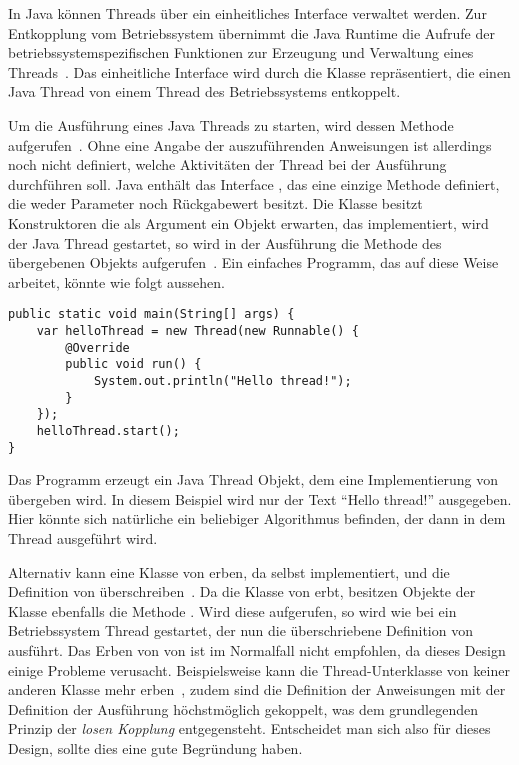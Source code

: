 In Java können Threads über ein einheitliches Interface verwaltet werden. Zur Entkopplung vom Betriebssystem übernimmt die Java Runtime die Aufrufe der betriebssystemspezifischen Funktionen zur Erzeugung und Verwaltung eines Threads~\cite[S.~3]{Friesen2015}. Das einheitliche Interface wird durch die Klasse  repräsentiert, die einen Java Thread von einem Thread des  Betriebssystems entkoppelt. 

Um die Ausführung eines Java Threads zu starten, wird dessen Methode  aufgerufen~\cite[S.~8]{Friesen2015}. Ohne eine Angabe der auszuführenden Anweisungen ist allerdings noch nicht definiert, welche Aktivitäten der Thread bei der Ausführung durchführen soll. Java enthält das Interface , das eine einzige Methode  definiert, die weder Parameter noch Rückgabewert besitzt. Die Klasse  besitzt Konstruktoren die als Argument ein Objekt erwarten, das  implementiert, wird der Java Thread gestartet, so wird in der Ausführung die  Methode des übergebenen Objekts aufgerufen~\cite[S.~3]{Friesen2015}. Ein einfaches Programm, das auf diese Weise arbeitet, könnte wie folgt aussehen.
\begin{lstlisting}
public static void main(String[] args) {
	var helloThread = new Thread(new Runnable() {
		@Override
		public void run() {
			System.out.println("Hello thread!");
		}
	});
	helloThread.start();
}
\end{lstlisting}
Das Programm erzeugt ein Java Thread Objekt, dem eine Implementierung von  übergeben wird. In diesem Beispiel wird nur der Text \enquote{Hello thread!} ausgegeben. Hier könnte sich natürliche ein beliebiger Algorithmus befinden, der dann in dem Thread ausgeführt wird.

Alternativ kann eine Klasse von  erben, da  selbst  implementiert, und die Definition von  überschreiben~\cite[S.~335]{Rauber2006}. Da die Klasse von  erbt, besitzen Objekte der Klasse ebenfalls die Methode . Wird diese aufgerufen, so wird wie bei  ein Betriebssystem Thread gestartet, der nun die überschriebene Definition von  ausführt. Das Erben von von  ist im Normalfall nicht empfohlen, da dieses Design einige Probleme verusacht. Beispielsweise kann die Thread-Unterklasse von keiner anderen Klasse mehr erben~\cite[S.~335]{Rauber2006}, zudem sind die Definition der Anweisungen mit der Definition der Ausführung höchstmöglich gekoppelt, was dem grundlegenden Prinzip der \emph{losen Kopplung} entgegensteht. Entscheidet man sich also für dieses Design, sollte dies eine gute Begründung haben.

